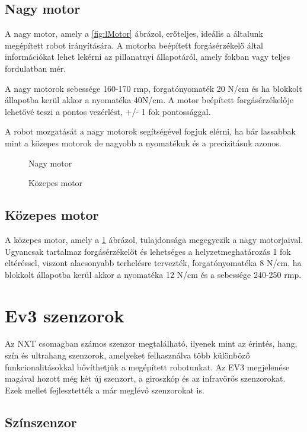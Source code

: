 \subsection{Nagy motor}
A nagy motor, amely a \ref{fig:lMotor} ábrázol, erőteljes, ideális a általunk megépített robot irányítására. A motorba beépített forgásérzékelő által  információkat lehet lekérni az pillanatnyi állapotáról, amely fokban vagy teljes fordulatban mér.

A nagy motorok sebessége 160-170 rmp, forgatónyomaték 20 N/cm és ha blokkolt állapotba kerül akkor a nyomatéka 40N/cm. A motor beépített forgásérzékelője lehetővé teszi a pontos vezérlést, +/- 1 fok pontossággal.

A robot mozgatását a nagy motorok segítségével fogjuk elérni, ha bár lassabbak mint a közepes motorok de nagyobb a nyomatékuk és a precizitásuk azonos.

\begin{figure}[!htb]
	\centering
	\caption{Nagy motor}
	\label{fig:lMotor}
	\endminipage
	\caption{Közepes motor}
	\label{fig:mMotor}
	\endminipage
\end{figure}

\subsection{Közepes motor}
A közepes motor, amely a \ref{fig:mMotor} ábrázol, tulajdonsága megegyezik a nagy motorjaival. Ugyancsak tartalmaz forgásérzékelőt és lehetséges a helyzetmeghatározás 1 fok eltéréssel, viszont alacsonyabb terhelésre tervezték, forgatónyomatéka 8 N/cm, ha blokkolt állapotba kerül akkor a nyomatéka 12 N/cm és a sebessége 240-250 rmp.

\section{Ev3 szenzorok}\label{sec:ROBOT:szenzorok}

Az NXT csomagban számos szenzor megtalálható, ilyenek mint az érintés, hang, szín és ultrahang szenzorok, amelyeket felhasználva több különböző funkcionalitásokkal bővíthetjük a megépített robotunkat. Az EV3 megjelenése magával hozott még két új szenzort, a giroszkóp és az infravörös szenzorokat. Ezek mellet fejlesztették a már meglévő szenzorokat is.

\subsection{Színszenzor}

